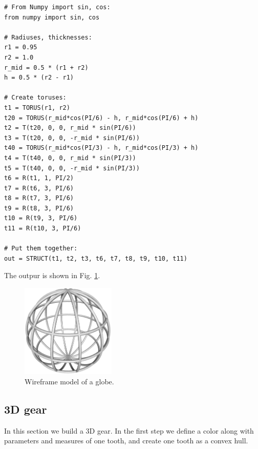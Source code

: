 \begin{bbox}
\begin{verbatim}
# From Numpy import sin, cos:
from numpy import sin, cos

# Radiuses, thicknesses:
r1 = 0.95
r2 = 1.0
r_mid = 0.5 * (r1 + r2)
h = 0.5 * (r2 - r1)

# Create toruses:
t1 = TORUS(r1, r2)
t20 = TORUS(r_mid*cos(PI/6) - h, r_mid*cos(PI/6) + h)
t2 = T(t20, 0, 0, r_mid * sin(PI/6))
t3 = T(t20, 0, 0, -r_mid * sin(PI/6))
t40 = TORUS(r_mid*cos(PI/3) - h, r_mid*cos(PI/3) + h)
t4 = T(t40, 0, 0, r_mid * sin(PI/3))
t5 = T(t40, 0, 0, -r_mid * sin(PI/3))
t6 = R(t1, 1, PI/2)
t7 = R(t6, 3, PI/6)
t8 = R(t7, 3, PI/6)
t9 = R(t8, 3, PI/6)
t10 = R(t9, 3, PI/6)
t11 = R(t10, 3, PI/6)

# Put them together:
out = STRUCT(t1, t2, t3, t6, t7, t8, t9, t10, t11)
\end{verbatim}
\end{bbox}
\vspace{6mm}

\noindent
The outpur is shown in Fig. \ref{fig:globe}.\\

\begin{figure}[!ht]
\begin{center}
\includegraphics[width=0.4\textwidth]{img/globe.png}
\end{center}
\vspace{-4mm}
\caption{Wireframe model of a globe.}
\label{fig:globe}
\vspace{-1cm}
\end{figure}

\newpage

\subsection{3D gear}

In this section we build a 3D gear. In the first step we define 
a color along with parameters and measures of one tooth, and
create one tooth as a convex hull.\\

